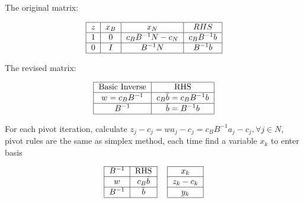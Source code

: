                 The original matrix:

                \begin{align}
                    \begin{tabular} {|c|c|c|c|}
                        \hline
                        $z$ & $x_B$ & $x_N$ & $RHS$ \\
                        \hline
                        1 & 0 & $c_BB^{-1}N - c_N$ & $c_BB^{-1}b$ \\
                        \hline
                        0 & $I$ & $B^{-1}N$ & $B^{-1}b$ \\
                        \hline
                    \end{tabular} \nonumber     
                \end{align}

                The revised matrix:

                \begin{align}
                    \begin{tabular} {|c|c|}
                        \hline
                        Basic Inverse & RHS \\
                        \hline
                        $w=c_BB^{-1}$ & $c_B\bar{b} = c_BB^{-1}b$\\
                        \hline
                        $B^{-1}$ & $\bar{b} = B^{-1}b$\\
                        \hline
                    \end{tabular} \nonumber
                \end{align}

                For each pivot iteration, calculate $z_j - c_j = wa_j - c_j = c_BB^{-1}a_j - c_j, \forall j\in N$, pivot rules are the same as simplex method, each time find a variable $x_k$ to enter basis

                \begin{align}
                    \begin{tabular}{|c|c|c|c|}
                        \cline{1-2} \cline{4-4} $B^{-1}$ & RHS & & $x_k$ \\
                        \cline{1-2} \cline{4-4} $w$ & $c_B\bar{b}$ & & $z_k-c_k$ \\
                        \cline{1-2} \cline{4-4} $B^{-1}$ & $\bar{b}$ & & $y_k$ \\
                        \cline{1-2} \cline{4-4}
                    \end{tabular} \nonumber
                \end{align}

